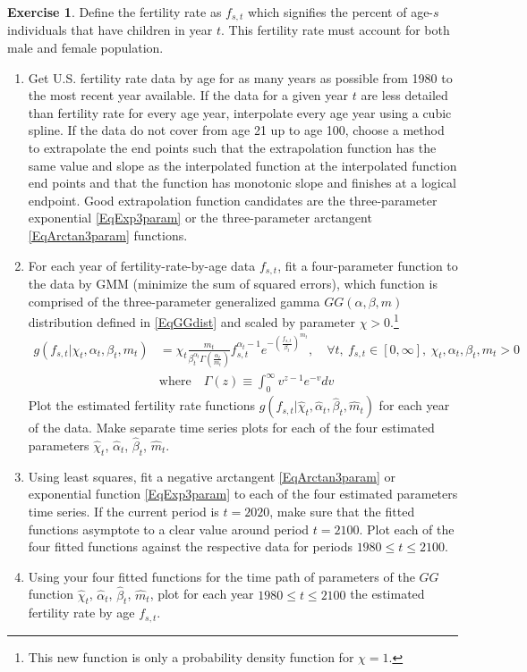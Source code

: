 \documentclass[letterpaper,12pt]{article}
\theoremstyle{definition}
\newtheorem{exercise}[theorem]{Exercise}
\begin{document}
  \begin{exercise}\label{ExFertEst}
    Define the fertility rate as $f_{s,t}$ which signifies the percent of age-$s$ individuals that have children in year $t$. This fertility rate must account for both male and female population.
    \begin{enumerate}
      \item Get U.S. fertility rate data by age for as many years as possible from 1980 to the most recent year available. If the data for a given year $t$ are less detailed than fertility rate for every age year, interpolate every age year using a cubic spline. If the data do not cover from age 21 up to age 100, choose a method to extrapolate the end points such that the extrapolation function has the same value and slope as the interpolated function at the interpolated function end points and that the function has monotonic slope and finishes at a logical endpoint. Good extrapolation function candidates are the three-parameter exponential \eqref{EqExp3param} or the three-parameter arctangent \eqref{EqArctan3param} functions.
      \item For each year of fertility-rate-by-age data $f_{s,t}$, fit a four-parameter function to the data by GMM (minimize the sum of squared errors), which function is comprised of the three-parameter generalized gamma $GG(\alpha,\beta,m)$ distribution defined in \eqref{EqGGdist} and scaled by parameter $\chi>0$.\footnote{This new function is only a probability density function for $\chi=1$.}
      \begin{equation}\label{EqFert4param}
        \begin{split}
          g(f_{s,t}|\chi_t,\alpha_t,\beta_t,m_t) &= \chi_t\frac{m_t}{\beta_t^{\alpha_t} \Gamma\left(\frac{\alpha_t}{m_t}\right)}f_{s,t}^{\alpha_t-1}e^{-\left(\frac{f_{s,t}}{\beta_t}\right)^{m_t}}, \quad\forall t,\: f_{s,t}\in[0,\infty],\:\chi_t,\alpha_t,\beta_t,m_t>0 \\
          &\text{where}\quad \Gamma(z)\equiv \int_0^\infty v^{z-1}e^{-v}dv
        \end{split}
      \end{equation}
      Plot the estimated fertility rate functions $g(f_{s,t}|\hat{\chi}_t,\hat{\alpha}_t,\hat{\beta}_t,\hat{m}_t)$ for each year of the data. Make separate time series plots for each of the four estimated parameters $\hat{\chi}_t$, $\hat{\alpha}_t$, $\hat{\beta}_t$, $\hat{m}_t$.
      \item Using least squares, fit a negative arctangent \eqref{EqArctan3param} or exponential function \eqref{EqExp3param} to each of the four estimated parameters time series. If the current period is $t=2020$, make sure that the fitted functions asymptote to a clear value around period $t=2100$. Plot each of the four fitted functions against the respective data for periods $1980\leq t\leq 2100$.
      \item Using your four fitted functions for the time path of parameters of the $GG$ function $\hat{\chi}_t$, $\hat{\alpha}_t$, $\hat{\beta}_t$, $\hat{m}_t$, plot for each year $1980\leq t\leq 2100$ the estimated fertility rate by age $f_{s,t}$.
    \end{enumerate}
  \end{exercise}
\end{document}
